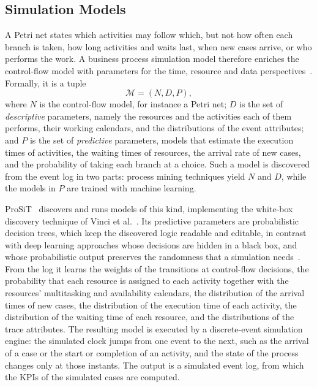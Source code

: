 \subsection{Simulation Models}
    \label{subsec:bg:simulation:model}
    A Petri net states which activities may follow which, but not how often each
    branch is taken, how long activities and waits last, when new cases arrive,
    or who performs the work. A business process simulation model therefore
    enriches the control-flow model with parameters for the time, resource and
    data perspectives~\cite{vinci2025online}. Formally, it is a tuple
    \begin{equation}
    \mathcal{M} = (N, D, P),
    \label{eq:bg:sim:bpsmodel}
    \end{equation}
    where $N$ is the control-flow model, for instance a Petri net; $D$ is the set
    of \emph{descriptive} parameters, namely the resources and the activities each
    of them performs, their working calendars, and the distributions of the event
    attributes; and $P$ is the set of \emph{predictive} parameters, models that
    estimate the execution times of activities, the waiting times of resources,
    the arrival rate of new cases, and the probability of taking each branch at a
    choice. Such a model is discovered from the event log in
    two parts: process mining techniques yield $N$ and $D$, while the models in $P$
    are trained with machine learning.
    
    ProSiT~\cite{vinci2025prosit} discovers and runs models of this kind,
    implementing the white-box discovery technique of Vinci et
    al.~\cite{vinci2025reliable}. Its predictive parameters are probabilistic
    decision trees, which keep the
    discovered logic readable and editable, in contrast with deep learning
    approaches whose decisions are hidden in a black box, and whose probabilistic
    output preserves the randomness that a simulation
    needs~\cite{vinci2025online}. From the log it learns the
    weights of the transitions at control-flow decisions, the probability that
    each resource is assigned to each activity together with the resources'
    multitasking and availability calendars, the distribution of the arrival
    times of new cases, the distribution of the execution time of each activity,
    the distribution of the waiting time of each resource, and the distributions
    of the trace attributes. The resulting model is executed
    by a discrete-event simulation engine: the simulated
    clock jumps from one event to the next, such as the arrival of a case or the
    start or completion of an activity, and the state of the process changes only
    at those instants. The output is a simulated event log, from which the KPIs
    of the simulated cases are computed.
    
